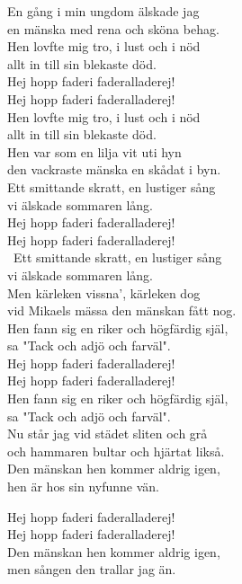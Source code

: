 \documentclass[a6paper,10pt]{article}
\begin{document}
\noindent
\begin{center}
\end{center}
\begin{lyrics}
En gång i min ungdom älskade jag\\
en mänska med rena och sköna behag.\\
Hen lovfte mig tro, i lust och i nöd\\
allt in till sin blekaste död.
\vspace{5pt}\\
Hej hopp faderi faderalladerej!\\
Hej hopp faderi faderalladerej!\\
Hen lovfte mig tro, i lust och i nöd\\
allt in till sin blekaste död.
\vspace{5pt}\\
Hen var som en lilja vit uti hyn\\
den vackraste mänska en skådat i byn.\\
Ett smittande skratt, en lustiger sång\\
vi älskade sommaren lång.
\vspace{5pt}\\
Hej hopp faderi faderalladerej!\\
Hej hopp faderi faderalladerej!\\\
Ett smittande skratt, en lustiger sång\\
vi älskade sommaren lång.
\vspace{5pt}\\
Men kärleken vissna', kärleken dog\\
vid Mikaels mässa den mänskan fått nog.\\
Hen fann sig en riker och högfärdig själ,\\
sa "Tack och adjö och farväl".
\vspace{5pt}\\
Hej hopp faderi faderalladerej!\\
Hej hopp faderi faderalladerej!\\
Hen fann sig en riker och högfärdig själ,\\
sa "Tack och adjö och farväl".
\vspace{5pt}\\
Nu står jag vid städet sliten och grå\\
och hammaren bultar och hjärtat likså.\\
Den mänskan hen kommer aldrig igen,\\
hen är hos sin nyfunne vän.

\newpage
\setlength{\oddsidemargin}{-0.37in}
\noindent
Hej hopp faderi faderalladerej!\\
Hej hopp faderi faderalladerej!\\
Den mänskan hen kommer aldrig igen,\\
men sången den trallar jag än. 
\end{lyrics}
\end{document}
